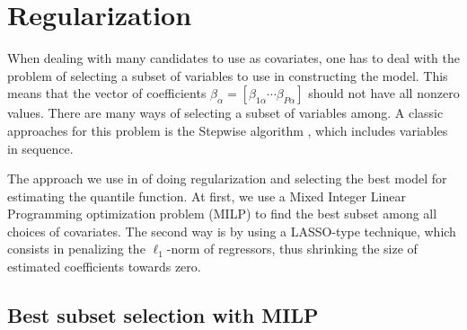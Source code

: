 \section{Regularization}

When dealing with many candidates to use as covariates, one has to deal with the problem of selecting a subset of variables to use in constructing the model. 
This means that the vector of coefficients $\beta_\alpha = [ \beta_{1 \alpha} \cdots \beta_{P\alpha} ]$ should not have all nonzero values.
There are many ways of selecting a subset of variables among.
A classic approaches for this problem is the Stepwise algorithm \cite{efroymson1960multiple}, which includes variables in sequence. 

The approach we use in  of doing regularization and selecting the best model for estimating the quantile function. At first, we use a Mixed Integer Linear Programming optimization problem (MILP) to find the best subset among all choices of covariates. The second way is by using a LASSO-type technique, which consists in penalizing the $\ell_1$-norm of regressors, thus shrinking the size of estimated coefficients towards zero.  

\subsection{Best subset selection with MILP}
\label{sec:best-subset-mip}

